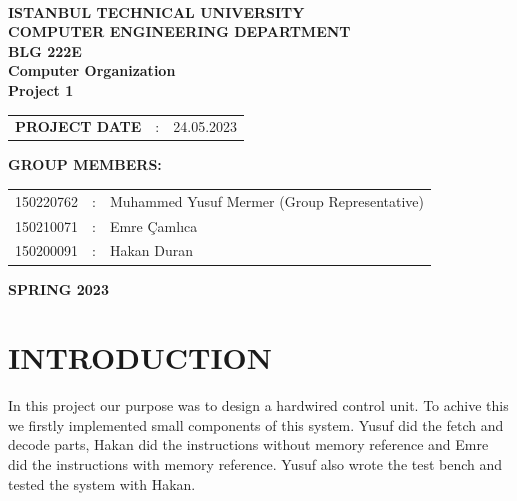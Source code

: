 \documentclass[pdftex,12pt,a4paper]{article}
\begin{document}
\begin{titlepage}
\begin{center}
\textbf{}\\
\textbf{\Large{ISTANBUL TECHNICAL UNIVERSITY}}\\
\vspace{0.5cm}
\textbf{\Large{COMPUTER ENGINEERING DEPARTMENT}}\\
\vspace{2cm}
\textbf{\Large{BLG 222E\\ Computer Organization \\ Project 1}}\\
\vspace{2.8cm}
\begin{table}[ht]
\centering
\Large{
\begin{tabular}{lcl}
\textbf{PROJECT DATE}  & : & 24.05.2023\\
\end{tabular}}
\end{table}
\vspace{1cm}
\textbf{\Large{GROUP MEMBERS:}}\\
\begin{table}[ht]
\centering
\Large{
\begin{tabular}{rcl}
150220762  & : & Muhammed Yusuf Mermer (Group Representative)  \\
150210071  & : & Emre Çamlıca \\
150200091  & : & Hakan Duran \\
\end{tabular}}
\end{table}
\vspace{2.8cm}
\textbf{\Large{SPRING 2023}}

\end{center}

\end{titlepage}

\thispagestyle{empty}
\setcounter{tocdepth}{4}
\tableofcontents
\clearpage

\setcounter{page}{1}
\section{INTRODUCTION}
In this project our purpose was to design a hardwired control unit. To achive 
this we firstly implemented small components of this system. Yusuf did the fetch and decode parts, Hakan did the instructions without memory reference and Emre did the instructions with memory reference. Yusuf also wrote the test bench and tested the system with Hakan.
\end{document}
